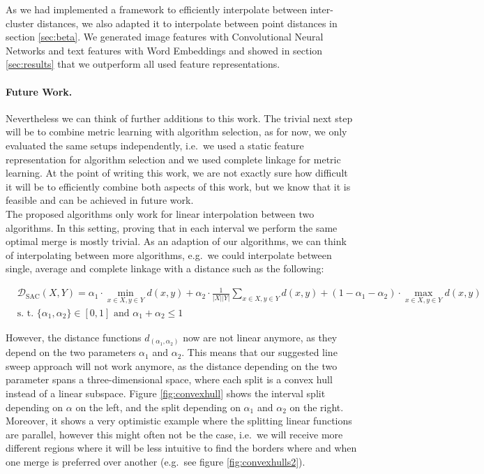 As we had implemented a framework to efficiently interpolate between inter-cluster distances, we also adapted it to interpolate between point distances in section \ref{sec:beta}. We generated image features with Convolutional Neural Networks and text features with Word Embeddings and showed in section \ref{sec:results} that we outperform all used feature representations.


\paragraph{Future Work.} Nevertheless we can think of further additions to this work. The trivial next step will be to combine metric learning with algorithm selection, as for now, we only evaluated the same setups independently, i.e.\ we used a static feature representation for algorithm selection and we used complete linkage for metric learning. At the point of writing this work, we are not exactly sure how difficult it will be to efficiently combine both aspects of this work, but we know that it is feasible and can be achieved in future work.\\

The proposed algorithms only work for linear interpolation between two algorithms. In this setting, proving that in each interval we perform the same optimal merge is mostly trivial. As an adaption of our algorithms, we can think of interpolating between more algorithms, e.g.\ we could interpolate between single, average and complete linkage with a distance such as the following:

\begin{align*}
&\mathcal{D}_\text{SAC}(X,Y) = \alpha_1 \cdot \min\limits_{x \in X, y \in Y} d(x,y) + \alpha_2 \cdot \frac{1}{|X||Y|} \sum\limits_{x \in X, y \in Y} d(x,y) + (1-\alpha_1-\alpha_2) \cdot \max\limits_{x \in X, y \in Y} d(x,y)\\
&\text{s. t. } \{\alpha_1, \alpha_2\} \in [0,1] \text{ and } \alpha_1 + \alpha_2 \le 1
\end{align*}

However, the distance functions $d_{(\alpha_1, \alpha_2)}$ now are not linear anymore, as they depend on the two parameters $\alpha_1$ and $\alpha_2$. This means that our suggested line sweep approach will not work anymore, as the distance depending on the two parameter spans a three-dimensional space, where each split is a convex hull instead of a linear subspace. Figure \ref{fig:convexhull} shows the interval split depending on $\alpha$ on the left, and the split depending on $\alpha_1$ and $\alpha_2$ on the right. Moreover, it shows a very optimistic example where the splitting linear functions are parallel, however this might often not be the case, i.e.\ we will receive more different regions where it will be less intuitive to find the borders where and when one merge is preferred over another (e.g.\ see figure \ref{fig:convexhulls2}).

